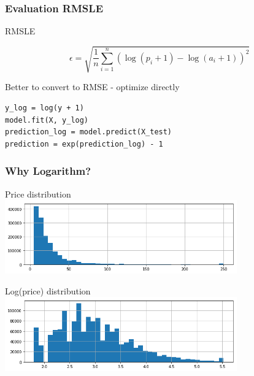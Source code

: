 \begin{frame}[fragile]
\frametitle{Evaluation RMSLE}



RMSLE

$$\epsilon = \sqrt{\frac{1}{n} \sum\limits_{i=1}^n (\log(p_i + 1) - \log(a_i+1))^2 }$$

Better to convert to RMSE - optimize directly

\begin{verbatim}
y_log = log(y + 1)
model.fit(X, y_log)
prediction_log = model.predict(X_test)
prediction = exp(prediction_log) - 1
\end{verbatim}

\end{frame}

\begin{frame}
\frametitle{Why Logarithm?}


Price distribution \\
\includegraphics[width=0.75\textwidth]{img/price_distribution.png}

Log(price) distribution \\
\includegraphics[width=0.75\textwidth]{img/price_log_distribution.png}

\end{frame}

